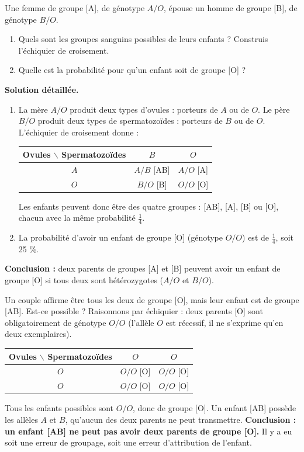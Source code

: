\documentclass[11pt]{article}
\begin{document}
\begin{exoresolu}
Une femme de groupe [A], de génotype $A/O$, épouse un homme de groupe [B], de génotype $B/O$.
\begin{enumerate}
\item Quels sont les groupes sanguins possibles de leurs enfants ? Construis l'échiquier de croisement.
\item Quelle est la probabilité pour qu'un enfant soit de groupe [O] ?
\end{enumerate}
\tcblower
\textbf{Solution détaillée.}
\begin{enumerate}
\item La mère $A/O$ produit deux types d'ovules : porteurs de $A$ ou de $O$. Le père $B/O$ produit deux types de spermatozoïdes : porteurs de $B$ ou de $O$. L'échiquier de croisement donne :
\begin{center}
\begin{tabular}{|c|c|c|}
\hline
\rowcolor{popblueL} \textbf{Ovules $\backslash$ Spermatozoïdes} & $B$ & $O$ \\
\hline
$A$ & $A/B$ [AB] & $A/O$ [A] \\
\hline
$O$ & $B/O$ [B] & $O/O$ [O] \\
\hline
\end{tabular}
\end{center}
Les enfants peuvent donc être des quatre groupes : [AB], [A], [B] ou [O], chacun avec la même probabilité $\frac{1}{4}$.
\item La probabilité d'avoir un enfant de groupe [O] (génotype $O/O$) est de $\frac{1}{4}$, soit 25 \%.
\end{enumerate}
\textbf{Conclusion :} deux parents de groupes [A] et [B] peuvent avoir un enfant de groupe [O] si tous deux sont hétérozygotes ($A/O$ et $B/O$).
\end{exoresolu}

\begin{exemplebox}
Un couple affirme être tous les deux de groupe [O], mais leur enfant est de groupe [AB]. Est-ce possible ? Raisonnons par échiquier : deux parents [O] sont obligatoirement de génotype $O/O$ (l'allèle $O$ est récessif, il ne s'exprime qu'en deux exemplaires).
\begin{center}
\begin{tabular}{|c|c|c|}
\hline
\rowcolor{popblueL} \textbf{Ovules $\backslash$ Spermatozoïdes} & $O$ & $O$ \\
\hline
$O$ & $O/O$ [O] & $O/O$ [O] \\
\hline
$O$ & $O/O$ [O] & $O/O$ [O] \\
\hline
\end{tabular}
\end{center}
Tous les enfants possibles sont $O/O$, donc de groupe [O]. Un enfant [AB] possède les allèles $A$ et $B$, qu'aucun des deux parents ne peut transmettre. \textbf{Conclusion : un enfant [AB] ne peut pas avoir deux parents de groupe [O].} Il y a eu soit une erreur de groupage, soit une erreur d'attribution de l'enfant.
\end{exemplebox}
\end{document}
